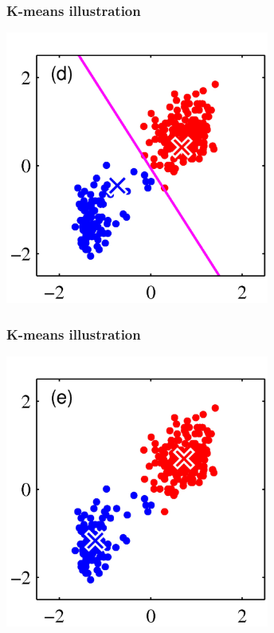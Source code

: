 \documentclass[12pt,notes,mathserif]{beamer}
\begin{document}
\begin{frame}[c]
	\frametitle{K-means illustration}
	\begin{center}
		\includegraphics[width=0.65\textwidth]{fig/lec721.jpg}
	\end{center}
\end{frame}

\begin{frame}[c]
	\frametitle{K-means illustration}
	\begin{center}
		\includegraphics[width=0.65\textwidth]{fig/lec722.jpg}
	\end{center}
\end{frame}
\end{document}
